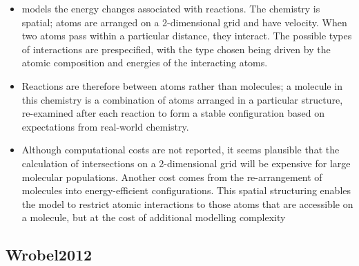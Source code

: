 		\begin{itemize}
			\item
			
			models the energy changes associated with reactions. The chemistry is
			spatial; atoms are arranged on a 2-dimensional grid and have velocity.
			When two atoms pass within a particular distance, they interact. The
			possible types of interactions are prespecified, with the type chosen
			being driven by the atomic composition and energies of the interacting
			atoms.
			
			\item
			
			Reactions are therefore between atoms rather than molecules; a
			molecule in this chemistry is a combination of atoms arranged in a
			particular structure, re-examined after each reaction to form a stable
			configuration based on expectations from real-world chemistry.
			
			\item
			
			Although computational costs are not reported, it seems plausible that
			the calculation of intersections on a 2-dimensional grid will be
			expensive for large molecular populations. Another cost comes from the
			re-arrangement of molecules into energy-efficient configurations. This
			spatial structuring enables the model to restrict atomic interactions
			to those atoms that are accessible on a molecule, but at the cost of
			additional modelling complexity
			
		\end{itemize}
		
		\hypertarget{wrobel2012}{\subsection{Wrobel2012 }\label{wrobel2012}}
		
